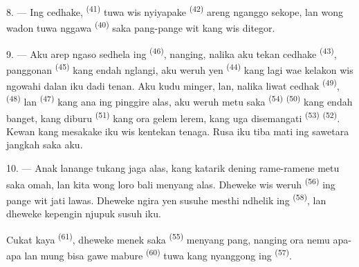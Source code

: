 8. --- Ing cedhake,  \textsuperscript{(41)}
tuwa wis nyiyapake  \textsuperscript{(42)} areng nganggo
sekope, lan wong wadon tuwa nggawa 
\textsuperscript{(40)}  saka pang-pange wit kang wis
ditegor.

\VUsaut{3.0mm}
\VUsaut{3.0mm}

9. --- Aku arep ngaso sedhela ing 
\textsuperscript{(46)}, nanging, nalika aku tekan cedhake  \textsuperscript{(43)}, panggonan  \textsuperscript{(45)}
kang endah nglangi, aku weruh yen 
\textsuperscript{(44)} kang lagi wae kelakon wis ngowahi dalan iku dadi
 tenan. Aku kudu minger, lan, nalika liwat cedhak
 \textsuperscript{(49)}, 
\textsuperscript{(48)} lan  \textsuperscript{(47)} kang
ana ing pinggire alas, aku weruh metu saka 
\textsuperscript{(54)}  \textsuperscript{(50)} kang
endah banget, kang diburu 
\textsuperscript{(51)} kang ora gelem lerem, kang uga disemangati
 \textsuperscript{(53)}  \textsuperscript{(52)}. Kewan kang mesakake iku wis
kentekan tenaga. Rusa iku tiba mati ing sawetara jangkah saka aku.

10. --- Anak lanange tukang jaga alas, kang katarik dening rame-ramene
 metu saka omah, lan kita wong loro bali menyang alas.
Dheweke wis weruh  \textsuperscript{(56)}
ing pange wit jati lawas. Dheweke ngira yen susuhe mesthi ndhelik ing
 \textsuperscript{(58)}, lan dheweke kepengin njupuk
susuh iku.

Cukat kaya  \textsuperscript{(61)}, dheweke menek saka
 \textsuperscript{(55)} menyang pang, nanging ora nemu
apa-apa lan mung bisa gawe mabure 
\textsuperscript{(60)} tuwa kang nyanggong ing 
\textsuperscript{(57)}.

\VUsaut{4.0mm}
\VUfilet{22mm}
